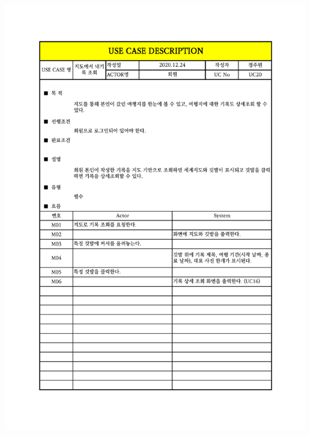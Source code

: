 {{{{{{{{{{{{{{{{{{{{{{\includegraphics[width=1.1\textwidth]{./Figure/Design/Display/usecase/020.pdf} \\
}}}}}}}}}}}}}}}}}}}}}}
